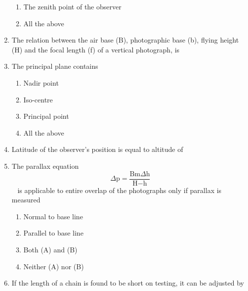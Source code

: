 \documentclass[11pt,a4paper]{article}
\begin{document}
\begin{enumerate}
\begin{enumerate}[label=\Alph*.]
\item{The zenith point of the observer}
\item{All the above}
\end{enumerate}
\item{The relation between the air base (B), photographic base (b), flying height (H) and the focal length (f) of a vertical photograph, is}
\\
\item{The principal plane contains}
\begin{enumerate}[label=\Alph*.]
\item{Nadir point}
\item{Iso-centre}
\item{Principal point}
\item{All the above}
\end{enumerate}
\item{Latitude of the observer's position is equal to altitude of}
\\
\item{The parallax equation $$\Delta {\text{p}} = \frac{{{\text{Bm}}\Delta {\text{h}}}}{{{\text{H}} - {\text{h}}}}$$ ~ is applicable to entire overlap of the photographs only if parallax is measured
}
\begin{enumerate}[label=\Alph*.]
\item{Normal to base line}
\item{Parallel to base line}
\item{Both (A) and (B)}
\item{Neither (A) nor (B)}
\end{enumerate}
\item{If the length of a chain is found to be short on testing, it can be adjusted by}

\end{enumerate}
\end{document}
